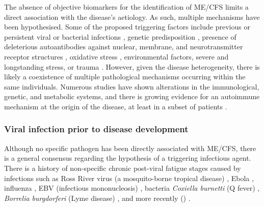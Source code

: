 The absence of objective biomarkers for the identification of ME/CFS limits a direct association with the disease's aetiology.
As such, multiple mechanisms have been hypothesised.
Some of the proposed triggering factors include previous or persistent viral or bacterial infections \citep{rasa2018ChronicViral}, genetic predisposition \citep{schlauch2016GenomewideAssociation}, presence of deleterious autoantibodies against nuclear, membrane, and neurotransmitter receptor structures \citep{loebel2016AntibodiesAdrenergic, sotznyMyalgicEncephalomyelitisChronic2018, wirth2020UnifyingHypothesis}, oxidative stress \citep{wood2021RoleMitochondria}, environmental factors, severe and longstanding stress, or trauma \citep{rivera2019MyalgicEncephalomyelitis}.
However, given the disease heterogeneity, there is likely a coexistence of multiple pathological mechanisms occurring within the same individuals.
Numerous studies have shown alterations in the immunological, genetic, and metabolic systems, and there is growing evidence for an autoimmune mechanism at the origin of the disease, at least in a subset of patients \citep{sotznyMyalgicEncephalomyelitisChronic2018}.


\subsubsection{Viral infection prior to disease development}

Although no specific pathogen has been directly associated with ME/CFS, there is a general consensus regarding the hypothesis of a triggering infectious agent.
There is a history of non-specific chronic post-viral fatigue stages caused by infections such as Ross River virus (a mosquito-borne tropical disease) \citep{harley2002RossRiver, hickie2006PostinfectiveChronicb}, Ebola \citep{hickie2006PostinfectiveChronicb, prevailiiistudygroup2019LongitudinalStudy}, influenza \citep{magnus2015ChronicFatigue}, 
EBV (infectious mononucleosis) \citep{pedersen2019PredictorsChronic}, bacteria \textit{Coxiella burnetti} (Q fever) \citep{ayres1998PostinfectionFatigue}, \textit{Borrelia burgdorferi} (Lyme disease) \citep{shadick1994LongtermClinical}, and more recently \sars (\covid) \citep{havervall2021SymptomsFunctional, choutka2022UnexplainedPostacute}.


